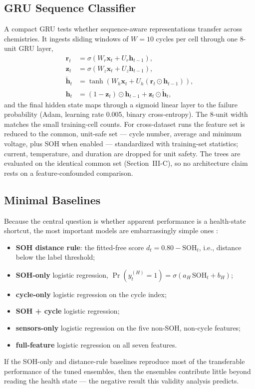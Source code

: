 \documentclass[preprint,12pt]{elsarticle}
\begin{document}
\subsection{GRU Sequence Classifier}
A compact GRU tests whether sequence-aware representations transfer across chemistries. It ingests sliding windows of $W{=}10$ cycles per cell through one 8-unit GRU layer,
\begin{equation}\label{eq:gru}
\begin{aligned}
\mathbf{r}_t &= \sigma(W_r\mathbf{x}_t + U_r\mathbf{h}_{t-1}),\\[2pt]
\mathbf{z}_t &= \sigma(W_z\mathbf{x}_t + U_z\mathbf{h}_{t-1}),\\[2pt]
\tilde{\mathbf{h}}_t &= \tanh(W_h\mathbf{x}_t + U_h(\mathbf{r}_t\odot\mathbf{h}_{t-1})),\\[2pt]
\mathbf{h}_t &= (1-\mathbf{z}_t)\odot\mathbf{h}_{t-1} + \mathbf{z}_t\odot\tilde{\mathbf{h}}_t,
\end{aligned}
\end{equation}
and the final hidden state maps through a sigmoid linear layer to the failure probability (Adam, learning rate 0.005, binary cross-entropy). The 8-unit width matches the small training-cell counts. For cross-dataset runs the feature set is reduced to the common, unit-safe set --- cycle number, average and minimum voltage, plus SOH when enabled --- standardized with training-set statistics; current, temperature, and duration are dropped for unit safety. The trees are evaluated on the identical common set (Section~III-C), so no architecture claim rests on a feature-confounded comparison.

\subsection{Minimal Baselines}
Because the central question is whether apparent performance is a health-state shortcut, the most important models are embarrassingly simple ones \cite{shikdar2026learning}:
\begin{itemize}
\item \textbf{SOH distance rule}: the fitted-free score $d_t = 0.80 - \mathrm{SOH}_t$, i.e., distance below the label threshold;
\item \textbf{SOH-only} logistic regression, $\Pr(y_t^{(H)}{=}1)=\sigma(a_H\,\mathrm{SOH}_t+b_H)$;
\item \textbf{cycle-only} logistic regression on the cycle index;
\item \textbf{SOH + cycle} logistic regression;
\item \textbf{sensors-only} logistic regression on the five non-SOH, non-cycle features;
\item \textbf{full-feature} logistic regression on all seven features.
\end{itemize}
If the SOH-only and distance-rule baselines reproduce most of the transferable performance of the tuned ensembles, then the ensembles contribute little beyond reading the health state --- the negative result this validity analysis predicts.
\end{document}
